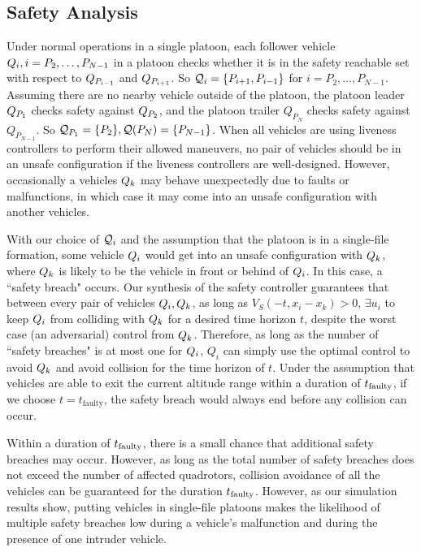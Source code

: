 \subsection{Safety Analysis}
Under normal operations in a single platoon, each follower vehicle $Q_{i},i=P_2,\ldots,P_{N-1}$ in a platoon checks whether it is in the safety reachable set with respect to $Q_{P_{i-1}}$ and $Q_{P_{i+1}}$. So $\mathcal{Q}_{i} = \{P_{i+1}, P_{i-1}\}$ for $i=P_2,\ldots,P_{N-1}$. Assuming there are no nearby vehicle outside of the platoon, the platoon leader $Q_{P_1}$ checks safety against $Q_{P_2}$, and the platoon trailer $Q_{P_N}$ checks safety against $Q_{P_{N-1}}$. So $\mathcal{Q}_{P_1}=\{P_2\}, \mathcal{Q}(P_N)=\{P_{N-1}\}$. When all vehicles are using liveness controllers to perform their allowed maneuvers, no pair of vehicles should be in an unsafe configuration if the liveness controllers are well-designed. However, occasionally a vehicles $Q_{k}$ may behave unexpectedly due to faults or malfunctions, in which case it may come into an unsafe configuration with another vehicles.

With our choice of $\mathcal{Q}_{i}$ and the assumption that the platoon is in a single-file formation, some vehicle $Q_{i}$ would get into an unsafe configuration with $Q_{k}$, where $Q_{k}$ is likely to be the vehicle in front or behind of $Q_{i}$. In this case, a ``safety breach" occurs. Our synthesis of the safety controller guarantees that between every pair of vehicles $Q_{i},Q_{k}$, as long as $V_S(-t,x_i- x_k)>0$, $\exists u_i$ to keep $Q_{i}$ from colliding with $Q_{k}$ for a desired time horizon $t$, despite the worst case (an adversarial) control from $Q_{k}$. Therefore, as long as the number of ``safety breaches" is at most one for $Q_{i}$, $Q_i$ can simply use the optimal control to avoid $Q_{k}$ and avoid collision for the time horizon of $t$. Under the assumption that vehicles are able to exit the current altitude range within a duration of $t_\text{faulty}$, if we choose $t=t_\text{faulty}$, the safety breach would always end before any collision can occur. 

Within a duration of $t_\text{faulty}$, there is a small chance that additional safety breaches may occur. However, as long as the total number of safety breaches does not exceed the number of affected quadrotors, collision avoidance of all the vehicles can be guaranteed for the duration $t_\text{faulty}$. However, as our simulation results show, putting vehicles in single-file platoons makes the likelihood of multiple safety breaches low during a vehicle's malfunction and during the presence of one intruder vehicle. 

